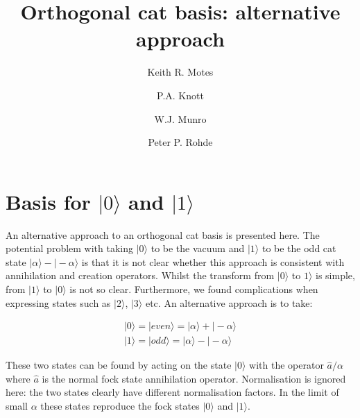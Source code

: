 \documentclass[twocolumn,prl]{revtex4}
\begin{document}
\title{Orthogonal cat basis: alternative approach}
\author{Keith R. Motes}
\author{P.A. Knott}
\author{W.J. Munro}
\author{Peter P. Rohde}
\pacs{}
\maketitle

\section{Basis for $|0\rangle$ and $|1\rangle$}

An alternative approach to an orthogonal cat basis is presented here. The potential problem with taking $|0\rangle$ to be the vacuum and $|1\rangle$ to be the odd cat state $|\alpha\rangle-|-\alpha\rangle$ is that it is not clear whether this approach is consistent with annihilation and creation operators. Whilst the transform from $|0\rangle$ to $1\rangle$ is simple, from $|1\rangle$ to $|0\rangle$ is not so clear. Furthermore, we found complications when expressing states such as $|2\rangle$, $|3\rangle$ etc. An alternative approach is to take:

\begin{eqnarray}
|0\rangle=|{even}\rangle =|\alpha\rangle+|-\alpha\rangle \\
|1\rangle=|{odd}\rangle =|\alpha\rangle-|-\alpha\rangle 
\end{eqnarray}

These two states can be found by acting on the state $|0\rangle$ with the operator $\hat{a}/\alpha$ where $\hat{a}$ is the normal fock state annihilation operator. Normalisation is ignored here: the two states clearly have different normalisation factors. In the limit of small $\alpha$ these states reproduce the fock states $|0\rangle$ and  $|1\rangle$.
\end{document}
